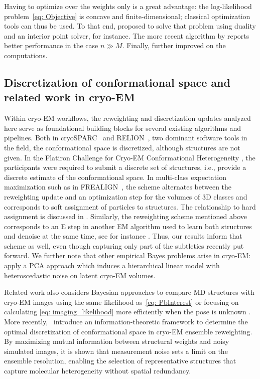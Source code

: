 \documentclass[12pt]{iopart}
\theoremstyle{remark}
\begin{document}
Having to optimize over the weights only is a great advantage: the log-likelihood problem~\eqref{eq: Objective} is concave and finite-dimensional; classical optimization tools can thus be used.
To that end, \citet{koenker2014convex} proposed to solve that problem using duality and an interior point solver, for instance. The more recent algorithm by \citet{kim2020fast} reports better performance in the case $n \gg M$.
Finally, \citet{zhang2024efficient} further improved on the computations.









\subsection{Discretization of conformational space and related work in cryo-EM}
\label{sec: relatedCryo}


Within cryo-EM workflows, the reweighting and discretization updates analyzed here serve as foundational building blocks for several existing algorithms and pipelines. Both in cryoSPARC~\citep{punjani2017cryosparc} and RELION~\citep{scheres2012relion},  two  dominant software tools in the field, the conformational space is discretized, although structures are not given.  In the Flatiron Challenge for Cryo-EM Conformational Heterogeneity \citep{astore2025inaugural}, the participants were required to submit a discrete set of structures, i.e., provide a discrete estimate of the conformational space.
In multi-class 
expectation maximization such as in FREALIGN~\citep{lyumkisLikelihoodbasedClassificationCryoEM2013}, the scheme alternates between the reweighting update and an optimization step for the volumes of 3D classes and corresponds to soft assignment of particles to structures. The relationship to hard assignment is discussed in \cite{evans2026counting}.  
Similarly, the reweighting scheme mentioned above corresponds to an E step in another EM algorithm used to learn both structures and denoise at the same time, see for instance \citet{balanov2025expectation}. Thus, our results inform that scheme as well, even though capturing only part of the subtleties recently put forward. 
We further note that other empirical Bayes problems arise in cryo-EM:~\cite{gilles2025cryo} apply a PCA approach which induces a hierarchical linear model with heteroscedastic noise on latent cryo-EM volumes.

 Related work also considers Bayesian approaches to compare MD structures with cryo-EM images using the same likelihood as~\eqref{eq: PbInterest} \citep{tang2023ensemble, giraldo2021bayesian} or focusing on calculating \eqref{eq: imaging_likelihood} more efficiently when the pose is unknown \cite{dingeldein2025amortized}. More recently,~\cite{mattingly2026measurement} introduce an information-theoretic framework to determine the optimal discretization of conformational space in cryo-EM ensemble reweighting. By maximizing mutual information between structural weights and noisy simulated images, it is shown that measurement noise sets a limit on the ensemble resolution, enabling the selection of representative structures that capture molecular heterogeneity without spatial redundancy.
\end{document}

